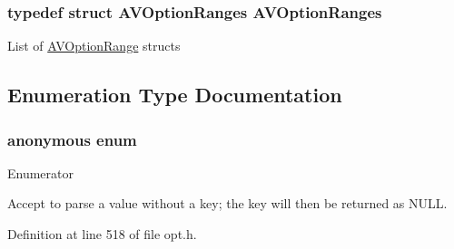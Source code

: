 \subsubsection[{\texorpdfstring{A\+V\+Option\+Ranges}{AVOptionRanges}}]{\setlength{\rightskip}{0pt plus 5cm}typedef struct {\bf A\+V\+Option\+Ranges}  {\bf A\+V\+Option\+Ranges}}\hypertarget{group__avoptions_gabebd014aa2f58f03966597e280661e17}{}\label{group__avoptions_gabebd014aa2f58f03966597e280661e17}
List of \hyperlink{struct_a_v_option_range}{A\+V\+Option\+Range} structs 

\subsection{Enumeration Type Documentation}
\subsubsection[{\texorpdfstring{anonymous enum}{anonymous enum}}]{\setlength{\rightskip}{0pt plus 5cm}anonymous enum}\hypertarget{group__avoptions_ga0411cd49bb5b71852cecd93bcbf0ca2d}{}\label{group__avoptions_ga0411cd49bb5b71852cecd93bcbf0ca2d}
\begin{Desc}
\item[Enumerator]\par
\begin{description}
\item[{\em 
A\+V\+\_\+\+O\+P\+T\+\_\+\+F\+L\+A\+G\+\_\+\+I\+M\+P\+L\+I\+C\+I\+T\+\_\+\+K\+EY\hypertarget{group__avoptions_gga0411cd49bb5b71852cecd93bcbf0ca2daa836a939d74606db85ce1f09470d1605}{}\label{group__avoptions_gga0411cd49bb5b71852cecd93bcbf0ca2daa836a939d74606db85ce1f09470d1605}
}]Accept to parse a value without a key; the key will then be returned as N\+U\+LL. \end{description}
\end{Desc}


Definition at line 518 of file opt.\+h.

